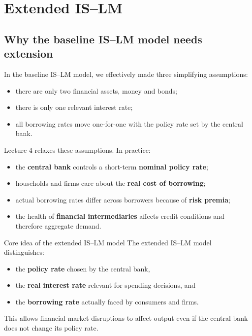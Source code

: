 
\section{Extended IS--LM}

\subsection{Why the baseline IS--LM model needs extension}

In the baseline IS--LM model, we effectively made three simplifying assumptions:
\begin{itemize}[leftmargin=1.5em]
    \item there are only two financial assets, money and bonds;
    \item there is only one relevant interest rate;
    \item all borrowing rates move one-for-one with the policy rate set by the central bank.
\end{itemize}

\noindent
Lecture 4 relaxes these assumptions. In practice:
\begin{itemize}[leftmargin=1.5em]
    \item the \textbf{central bank} controls a short-term \textbf{nominal policy rate};
    \item households and firms care about the \textbf{real cost of borrowing};
    \item actual borrowing rates differ across borrowers because of \textbf{risk premia};
    \item the health of \textbf{financial intermediaries} affects credit conditions and therefore aggregate demand.
\end{itemize}

\begin{definition}{Core idea of the extended IS--LM model}{}
The extended IS--LM model distinguishes:
\begin{itemize}[leftmargin=1.5em]
    \item the \textbf{policy rate} chosen by the central bank,
    \item the \textbf{real interest rate} relevant for spending decisions, and
    \item the \textbf{borrowing rate} actually faced by consumers and firms.
\end{itemize}
This allows financial-market disruptions to affect output even if the central bank does not change its policy rate.
\end{definition}

